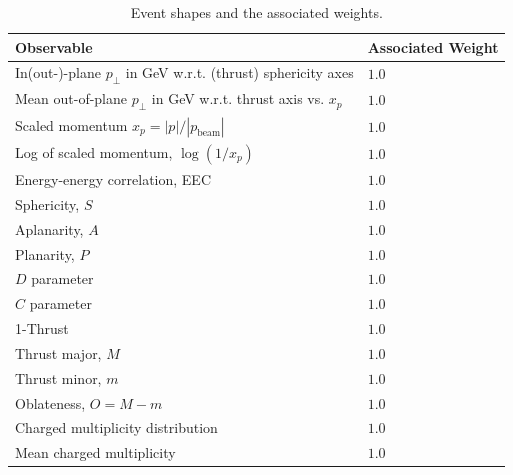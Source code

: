 \documentclass[aps,preprint,floatfix,nofootinbib,showpacs]{revtex4-1}
\begin{document}
  \begin{table}[tbp]
\begin{center}
\begin{tabular}{l|l}
\hline \hline 
Observable \hspace{1cm} &  Associated Weight \\ \hline
In(out-)-plane $p_\bot$ in GeV w.r.t. (thrust) sphericity axes & \hspace{1cm} $1.0$ \\ \hline 
Mean out-of-plane $p_\bot$ in GeV w.r.t. thrust axis vs. $x_p$ & \hspace{1cm} $1.0$ \\ \hline
Scaled momentum $x_p=|p|/|p_\text{beam}|$ & \hspace{1cm} $1.0$ \\ \hline
Log of scaled momentum, $\log(1/x_p)$ & \hspace{1cm} $1.0$ \\ \hline
Energy-energy correlation, EEC & \hspace{1cm} $1.0$ \\ \hline
Sphericity, $S$ & \hspace{1cm} $1.0$ \\ \hline
Aplanarity, $A$ & \hspace{1cm} $1.0$ \\ \hline
Planarity, $P$ & \hspace{1cm} $1.0$ \\ \hline
$D$ parameter & \hspace{1cm} $1.0$ \\ \hline
$C$ parameter & \hspace{1cm} $1.0$ \\ \hline
1-Thrust & \hspace{1cm} $1.0$ \\ \hline
Thrust major, $M$ & \hspace{1cm} $1.0$ \\ \hline
Thrust minor, $m$ & \hspace{1cm} $1.0$\\ \hline
Oblateness, $O=M-m$ &  \hspace{1cm} $1.0$ \\ \hline
Charged multiplicity distribution  & \hspace{1cm} $1.0$ \\ \hline
Mean charged multiplicity & \hspace{1cm} $1.0$ \\ \hline
\hline
\end{tabular}
\end{center}
\caption{Event shapes and the associated weights.}
\label{Tab4}
 \end{table}
\end{document}
